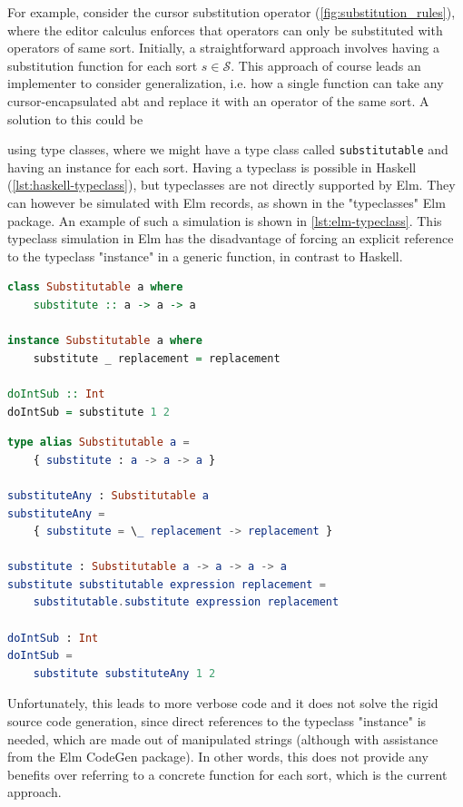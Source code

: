 \documentclass[sigplan,review]{acmart}
\newcommand{\abt}{\textsf{abt}\xspace}
\begin{document}
For example, consider the cursor substitution operator (\cref{fig:substitution_rules}),
where the editor calculus enforces that operators can only be substituted
with operators of same sort. Initially, a straightforward approach involves
having a substitution function for each sort $s \in \mathcal{S}$.
This approach of course leads an implementer to consider generalization,
i.e. how a single function can take any cursor-encapsulated \abt and replace it
with an operator of the same sort. A solution to this could be

using type classes, where we might have a type class called \texttt{substitutable}
and having an instance for each sort.
Having a typeclass is possible in Haskell (\cref{lst:haskell-typeclass}),
but typeclasses are not directly supported by Elm.
They can however be simulated with Elm records, as shown in the "typeclasses"
Elm package\cite{elm-typeclass-package}.
An example of such a simulation is shown in \cref{lst:elm-typeclass}.
This typeclass simulation in Elm has the disadvantage of forcing an explicit
reference to the typeclass "instance" in a generic function, in contrast to Haskell.

\begin{lstlisting}[language=Haskell,style=inline,caption={Haskell typeclass example},label={lst:haskell-typeclass}]
class Substitutable a where 
    substitute :: a -> a -> a
    
instance Substitutable a where
    substitute _ replacement = replacement

doIntSub :: Int
doIntSub = substitute 1 2 
\end{lstlisting}

\begin{lstlisting}[language=elm,style=inline,caption={Elm typeclass simulation example},label={lst:elm-typeclass}]
type alias Substitutable a =
    { substitute : a -> a -> a }

substituteAny : Substitutable a
substituteAny =
    { substitute = \_ replacement -> replacement }

substitute : Substitutable a -> a -> a -> a
substitute substitutable expression replacement =
    substitutable.substitute expression replacement

doIntSub : Int
doIntSub =
    substitute substituteAny 1 2
\end{lstlisting}

Unfortunately, this leads to more verbose code and it does not solve the rigid source code generation, since direct references to the typeclass "instance" is needed, which are made out of manipulated strings (although with assistance from the Elm CodeGen package). In other words, this
does not provide any benefits over referring to a concrete function for
each sort, which is the current approach.
\end{document}
